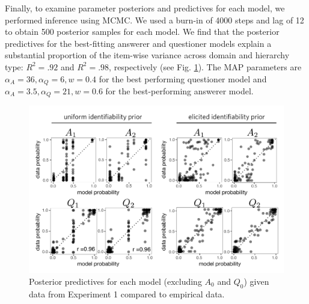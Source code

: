 \documentclass[11pt, floatsintext]{apa6}
\begin{document}
Finally, to examine parameter posteriors and predictives for each model, we performed inference using MCMC.
We used a burn-in of 4000 steps and lag of 12 to obtain 500 posterior samples for each model.
We find that the posterior predictives for the best-fitting answerer and questioner models explain a substantial proportion of the item-wise variance across domain and hierarchy type: $R^2 = .92$ and $R^2 = .98$, respectively (see Fig. \ref{fig:exp1predictives}). 
The MAP parameters are $\alpha_A = 36, \alpha_Q = 6, w = 0.4$ for the best performing questioner model and $\alpha_A = 3.5, \alpha_Q = 21, w = 0.6$ for the best-performing answerer model.

\begin{figure}[tb]
\begin{center}
\includegraphics[scale = .77]{Exp1/ResultsFig.pdf}
\end{center}
\caption{Posterior predictives for each model (excluding $A_0$ and $Q_0$) given data from Experiment 1 compared to empirical data.}
\label{fig:exp1predictives}
\end{figure}

%


%

%
\end{document}
